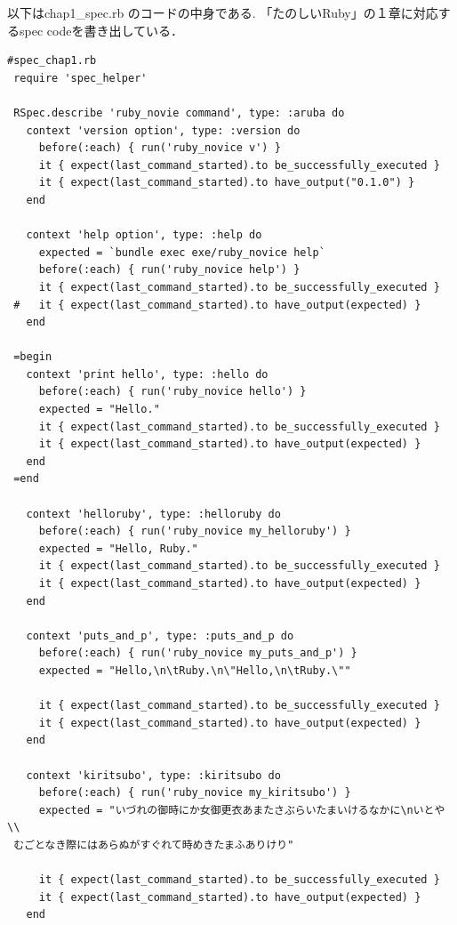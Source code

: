 以下はchap1\_spec.rb のコードの中身である. 
「たのしいRuby」の１章に対応するspec codeを書き出している．
\begin{lstlisting}[style=customRuby]
 #spec_chap1.rb
 require 'spec_helper'
 
 RSpec.describe 'ruby_novie command', type: :aruba do
   context 'version option', type: :version do
     before(:each) { run('ruby_novice v') }
     it { expect(last_command_started).to be_successfully_executed }
     it { expect(last_command_started).to have_output("0.1.0") }
   end
 
   context 'help option', type: :help do
     expected = `bundle exec exe/ruby_novice help`
     before(:each) { run('ruby_novice help') }
     it { expect(last_command_started).to be_successfully_executed }
 #   it { expect(last_command_started).to have_output(expected) }               
   end
 
 =begin                                                                          
   context 'print hello', type: :hello do                                        
     before(:each) { run('ruby_novice hello') }                                  
     expected = "Hello."                                                         
     it { expect(last_command_started).to be_successfully_executed }             
     it { expect(last_command_started).to have_output(expected) }    
   end                                                                           
 =end 
 
   context 'helloruby', type: :helloruby do
     before(:each) { run('ruby_novice my_helloruby') }
     expected = "Hello, Ruby."
     it { expect(last_command_started).to be_successfully_executed }
     it { expect(last_command_started).to have_output(expected) }
   end
 
   context 'puts_and_p', type: :puts_and_p do
     before(:each) { run('ruby_novice my_puts_and_p') }
     expected = "Hello,\n\tRuby.\n\"Hello,\n\tRuby.\""
 
     it { expect(last_command_started).to be_successfully_executed }
     it { expect(last_command_started).to have_output(expected) }
   end
 
   context 'kiritsubo', type: :kiritsubo do
     before(:each) { run('ruby_novice my_kiritsubo') }
     expected = "いづれの御時にか女御更衣あまたさぶらいたまいけるなかに\nいとや\\
 むごとなき際にはあらぬがすぐれて時めきたまふありけり"
 
     it { expect(last_command_started).to be_successfully_executed }
     it { expect(last_command_started).to have_output(expected) }
   end
 

\end{lstlisting}
